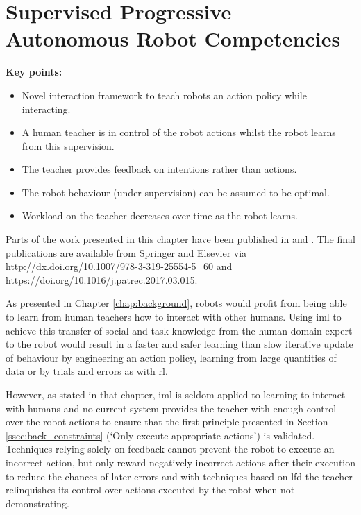 \chapter{Supervised Progressive Autonomous Robot \newline Competencies}\label{chap:sparc}

\graphicspath{{images/sparc/}}

\begin{framed}
	\textbf{Key points:}
	\begin{itemize}
		\item Novel interaction framework to teach robots an action policy while interacting.
		\item A human teacher is in control of the robot actions whilst the robot learns from this supervision.
		\item The teacher provides feedback on intentions rather than actions.
		\item The robot behaviour (under supervision) can be assumed to be optimal.
		\item Workload on the teacher decreases over time as the robot learns.
	\end{itemize}
\end{framed}

Parts of the work presented in this chapter have been published in \cite{senft2015sparc} and \cite{senft2017supervised}. The final publications are available from Springer and Elsevier via \url{http://dx.doi.org/10.1007/978-3-319-25554-5_60} and \url{https://doi.org/10.1016/j.patrec.2017.03.015}.

\newpage

As presented in Chapter \ref{chap:background}, robots would profit from being able to learn from human teachers how to interact with other humans. Using \gls{iml} to achieve this transfer of social and task knowledge from the human domain-expert to the robot would result in a faster and safer learning than slow iterative update of behaviour by engineering an action policy, learning from large quantities of data or by trials and errors as with \gls{rl}.

However, as stated in that chapter, \gls{iml} is seldom applied to learning to interact with humans and no current system provides the teacher with enough control over the robot actions to ensure that the first principle presented in Section \ref{ssec:back_constraints} (`Only execute appropriate actions') is validated. Techniques relying solely on feedback cannot prevent the robot to execute an incorrect action, but only reward negatively incorrect actions after their execution to reduce the chances of later errors \citep{senft2017supervised} and with techniques based on \gls{lfd} the teacher relinquishes its control over actions executed by the robot when not demonstrating.


